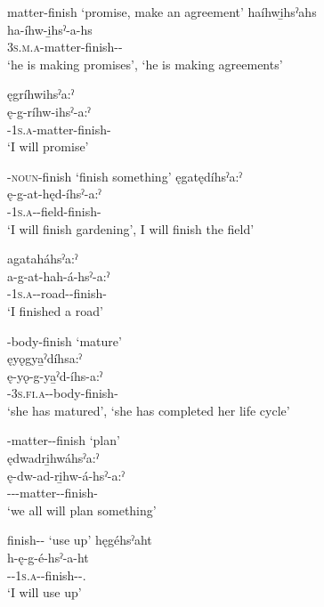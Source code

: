 \ea\label{ex:eventuative8}  matter-finish ‘promise, make an agreement’
\ea haíhwi̱hsˀahs\\
\gll ha-íhw-i̱hsˀ-a-hs\\
 \textsc{3s.m.a}-matter-finish-{\joinerA}-{\habitual}\\
\glt `he is making promises', `he is making agreements'

\ex ęgríhwihsˀa:ˀ\\
\gll ę-g-ríhw-ihsˀ-a:ˀ\\
 \fut-\textsc{1s.a}-matter-finish-{\punctual}\\
\glt `I will promise'
\z
\z

\ea\label{ex:eventuative11}  \textsc{\semireflexive-noun}-finish ‘finish something’
\ea ęgatędíhsˀa:ˀ\\
\gll ę-g-at-hęd-íhsˀ-a:ˀ\\
 \fut-\textsc{1s.a}-{\semireflexive}-field-finish-{\punctual}\\
\glt `I will finish gardening', I will finish the field'

\ex agataháhsˀa:ˀ\\
\gll a-g-at-hah-á-hsˀ-a:ˀ\\
 {\factual}-\textsc{1s.a}-{\semireflexive}-road-{\joinerA}-finish-{\punctual}\\
\glt `I finished a road'
\z
\z

\ea\label{ex:eventuative10}  {\semireflexive}-body-finish ‘mature’\\
ęyǫgya̱ˀdíhsa:ˀ\\
\gll ę-yǫ-g-ya̱ˀd-íhs-a:ˀ\\
 \fut-\textsc{3s.fi.a}-{\semireflexive}-body-finish-{\punctual}\\
\glt `she has matured', `she has completed her life cycle'
\z


\ea\label{ex:eventuative7}  {\semireflexive}-matter-{\joinerA}-finish ‘plan’\\
ędwadri̱hwáhsˀa:ˀ\\
\gll ę-dw-ad-ri̱hw-á-hsˀ-a:ˀ\\
 \fut--{\semireflexive}-matter-{\joinerA}-finish-{\punctual}\\
\glt `we all will plan something'
\z


\ea\label{ex:eventuative13}  finish-{\joinerA}- ‘use up’
\ea hęgéhsˀaht\\
\gll h-ę-g-é-hsˀ-a-ht\\
 {\translocative}-{\future}-\textsc{1s.a}-{\joinerE}-finish-{\joinerA}-{\causative}.{\zeropunctual}\\
\glt `I will use up'
\z
\z

